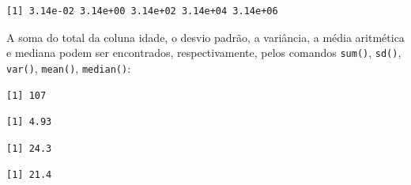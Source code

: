 \documentclass[12pt,brazil,oneside]{book}
\newenvironment{Shaded}{\begin{snugshade}}{\end{snugshade}}
\newcommand{\CommentTok}[1]{\textcolor[rgb]{0.56,0.35,0.01}{\textit{#1}}}
\newcommand{\KeywordTok}[1]{\textcolor[rgb]{0.13,0.29,0.53}{\textbf{#1}}}
\newcommand{\NormalTok}[1]{#1}
\newcommand{\OperatorTok}[1]{\textcolor[rgb]{0.81,0.36,0.00}{\textbf{#1}}}
\begin{document}
\begin{verbatim}
[1] 3.14e-02 3.14e+00 3.14e+02 3.14e+04 3.14e+06
\end{verbatim}

A soma do total da coluna idade, o desvio padrão, a variância, a média aritmética e mediana podem ser encontrados, respectivamente, pelos comandos \texttt{sum()}, \texttt{sd()}, \texttt{var()}, \texttt{mean()}, \texttt{median()}:

\begin{Shaded}
\end{Shaded}

\begin{verbatim}
[1] 107
\end{verbatim}

\begin{Shaded}
\end{Shaded}

\begin{verbatim}
[1] 4.93
\end{verbatim}

\begin{Shaded}
\end{Shaded}

\begin{verbatim}
[1] 24.3
\end{verbatim}

\begin{Shaded}
\end{Shaded}

\begin{verbatim}
[1] 21.4
\end{verbatim}
\end{document}
